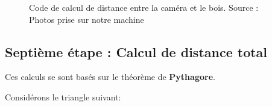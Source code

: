  \begin{figure}[H]%
	\center%
	\setlength{\fboxsep}{5pt}%
	\setlength{\fboxrule}{0.5pt}%
	\caption[Distance entre la caméra et le bois]{Code de calcul de distance entre la caméra et le bois. Source : Photos prise sur notre machine}
	\label{fig:Distance entre la caméra et le bois}
\end{figure}
 
 \subsection{Septième étape : Calcul de distance total}
 
 Ces calculs se sont basés sur le théorème de \textbf{Pythagore}. 
 
  Considérons le triangle suivant:
 
